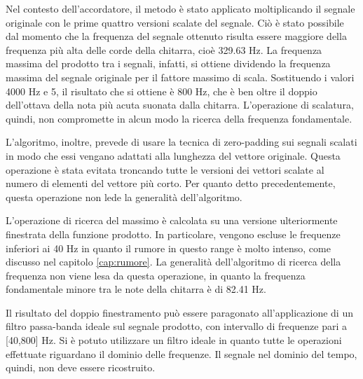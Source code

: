 		

	Nel contesto dell'accordatore, il metodo è stato applicato moltiplicando il segnale originale con le prime quattro versioni scalate del segnale.
	Ciò è stato possibile dal momento che la frequenza del segnale ottenuto risulta essere maggiore della frequenza più alta delle corde della chitarra, cioè 329.63 Hz.
	La frequenza massima del prodotto tra i segnali, infatti, si ottiene dividendo la frequenza massima del segnale originale per il fattore massimo di scala.
	Sostituendo i valori 4000 Hz e 5, il risultato che si ottiene è 800 Hz, che è ben oltre il doppio dell'ottava della nota più acuta suonata dalla chitarra. L'operazione di scalatura, quindi, non compromette in alcun modo la ricerca della frequenza fondamentale.

	L'algoritmo, inoltre, prevede di usare la tecnica di zero-padding sui segnali scalati in modo che essi vengano adattati alla lunghezza del vettore originale. 
	Questa operazione è stata evitata troncando tutte le versioni dei vettori scalate al numero di elementi del vettore più corto.
	Per quanto detto precedentemente, questa operazione non lede la generalità dell'algoritmo.

	L'operazione di ricerca del massimo è calcolata su una versione ulteriormente finestrata della funzione prodotto. 
	In particolare, vengono escluse le frequenze inferiori ai 40 Hz in quanto il rumore in questo range è molto intenso, come discusso nel capitolo \ref{cap:rumore}.
	La generalità dell'algoritmo di ricerca della frequenza non viene lesa da questa operazione, in quanto la frequenza fondamentale minore tra le note della chitarra è di 82.41 Hz.

	Il risultato del doppio finestramento può essere paragonato all'applicazione di un filtro passa-banda ideale sul segnale prodotto, con intervallo di frequenze pari a [40,800] Hz.
	Si è potuto utilizzare un filtro ideale in quanto tutte le operazioni effettuate riguardano il dominio delle frequenze.
	Il segnale nel dominio del tempo, quindi, non deve essere ricostruito.




